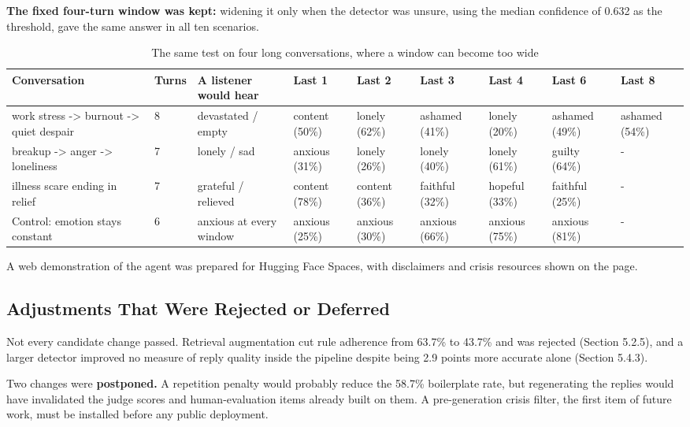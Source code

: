 \textbf{The fixed four-turn window was kept:} widening it only when the detector was unsure, using the median confidence of 0.632 as the threshold, gave the same answer in all ten scenarios.

\begin{table}[htbp]
\centering
\scriptsize
\begin{tabularx}{\textwidth}{@{}lXXXXXXXX@{}}
\toprule
\textbf{Conversation} & \textbf{Turns} & \textbf{A listener would hear} & \textbf{Last 1} & \textbf{Last 2} & \textbf{Last 3} & \textbf{Last 4} & \textbf{Last 6} & \textbf{Last 8} \\
\midrule
work stress -> burnout -> quiet despair & 8 & devastated / empty & content (50\%) & lonely (62\%) & ashamed (41\%) & lonely (20\%) & ashamed (49\%) & ashamed (54\%) \\
breakup -> anger -> loneliness & 7 & lonely / sad & anxious (31\%) & lonely (26\%) & lonely (40\%) & lonely (61\%) & guilty (64\%) & - \\
illness scare ending in relief & 7 & grateful / relieved & content (78\%) & content (36\%) & faithful (32\%) & hopeful (33\%) & faithful (25\%) & - \\
Control: emotion stays constant & 6 & anxious at every window & anxious (25\%) & anxious (30\%) & anxious (66\%) & anxious (75\%) & anxious (81\%) & - \\
\bottomrule
\end{tabularx}
\caption{The same test on four long conversations, where a window can become too wide}
\label{tab:5.4}
\end{table}

A web demonstration of the agent was prepared for Hugging Face Spaces, with disclaimers and crisis resources shown on the page.

\subsection{Adjustments That Were Rejected or Deferred}
\label{sec:5.3.3}

Not every candidate change passed. Retrieval augmentation cut rule adherence from 63.7\% to 43.7\% and was rejected (Section 5.2.5), and a larger detector improved no measure of reply quality inside the pipeline despite being 2.9 points more accurate alone (Section 5.4.3).

Two changes were \textbf{postponed.} A repetition penalty would probably reduce the 58.7\% boilerplate rate, but regenerating the replies would have invalidated the judge scores and human-evaluation items already built on them. A pre-generation crisis filter, the first item of future work, must be installed before any public deployment.

